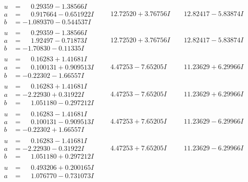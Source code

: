 \documentclass[1p]{elsarticle_modified}
\theoremstyle{definition}
\begin{document}
$$\begin{array}{c|c|c}
\begin{aligned}
u &= \phantom{-}0.29359 - 1.38566 I \\
a &= \phantom{-}0.917664 - 0.651922 I \\
b &= -1.089370 - 0.544537 I\end{aligned}
 & \phantom{-}12.72520 + 3.76756 I & \phantom{-}12.82417 - 5.83874 I \\ \hline\begin{aligned}
u &= \phantom{-}0.29359 - 1.38566 I \\
a &= \phantom{-}1.92497 - 0.71873 I \\
b &= -1.70830 - 0.11335 I\end{aligned}
 & \phantom{-}12.72520 + 3.76756 I & \phantom{-}12.82417 - 5.83874 I \\ \hline\begin{aligned}
u &= \phantom{-}0.16283 + 1.41681 I \\
a &= \phantom{-}0.100131 + 0.909513 I \\
b &= -0.22302 - 1.66557 I\end{aligned}
 & \phantom{-}4.47253 - 7.65205 I & \phantom{-}11.23629 + 6.29966 I \\ \hline\begin{aligned}
u &= \phantom{-}0.16283 + 1.41681 I \\
a &= -2.22930 + 0.31922 I \\
b &= \phantom{-}1.051180 - 0.297212 I\end{aligned}
 & \phantom{-}4.47253 - 7.65205 I & \phantom{-}11.23629 + 6.29966 I \\ \hline\begin{aligned}
u &= \phantom{-}0.16283 - 1.41681 I \\
a &= \phantom{-}0.100131 - 0.909513 I \\
b &= -0.22302 + 1.66557 I\end{aligned}
 & \phantom{-}4.47253 + 7.65205 I & \phantom{-}11.23629 - 6.29966 I \\ \hline\begin{aligned}
u &= \phantom{-}0.16283 - 1.41681 I \\
a &= -2.22930 - 0.31922 I \\
b &= \phantom{-}1.051180 + 0.297212 I\end{aligned}
 & \phantom{-}4.47253 + 7.65205 I & \phantom{-}11.23629 - 6.29966 I \\ \hline\begin{aligned}
u &= \phantom{-}0.493206 + 0.200165 I \\
a &= \phantom{-}1.076770 - 0.731073 I \\

\end{aligned}
\end{array}$$
\end{document}
